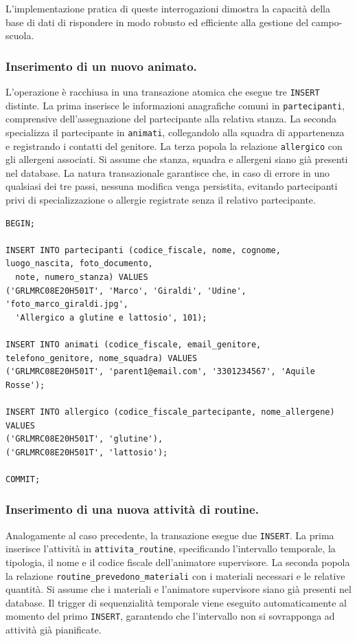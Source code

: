 \documentclass[11pt,a4paper]{article}
\begin{document}
L'implementazione pratica di queste interrogazioni dimostra la capacità della base di dati di
rispondere in modo robusto ed efficiente alla gestione del campo-scuola.

\subsubsection{Inserimento di un nuovo animato.}
L'operazione è racchiusa in una transazione atomica che esegue tre \texttt{INSERT} distinte. La
prima inserisce le informazioni anagrafiche comuni in \texttt{partecipanti}, comprensive
dell'assegnazione del partecipante alla relativa stanza. La seconda specializza il partecipante
in \texttt{animati}, collegandolo alla squadra di appartenenza e registrando i contatti del
genitore. La terza popola la relazione \texttt{allergico} con gli allergeni associati. Si
assume che stanza, squadra e allergeni siano già presenti nel database. La natura transazionale
garantisce che, in caso di errore in uno qualsiasi dei tre passi, nessuna modifica venga
persistita, evitando partecipanti privi di specializzazione o allergie registrate senza il
relativo partecipante.

\begin{verbatim}
BEGIN;

INSERT INTO partecipanti (codice_fiscale, nome, cognome, luogo_nascita, foto_documento,
  note, numero_stanza) VALUES
('GRLMRC08E20H501T', 'Marco', 'Giraldi', 'Udine', 'foto_marco_giraldi.jpg',
  'Allergico a glutine e lattosio', 101);

INSERT INTO animati (codice_fiscale, email_genitore, telefono_genitore, nome_squadra) VALUES
('GRLMRC08E20H501T', 'parent1@email.com', '3301234567', 'Aquile Rosse');

INSERT INTO allergico (codice_fiscale_partecipante, nome_allergene) VALUES
('GRLMRC08E20H501T', 'glutine'),
('GRLMRC08E20H501T', 'lattosio');

COMMIT;
\end{verbatim}

\subsubsection{Inserimento di una nuova attività di routine.}
Analogamente al caso precedente, la transazione esegue due \texttt{INSERT}. La prima inserisce
l'attività in \texttt{attivita\_routine}, specificando l'intervallo temporale, la tipologia, il
nome e il codice fiscale dell'animatore supervisore. La seconda popola la relazione
\texttt{routine\_prevedono\_materiali} con i materiali necessari e le relative quantità. Si
assume che i materiali e l'animatore supervisore siano già presenti nel database. Il trigger di
sequenzialità temporale viene eseguito automaticamente al momento del primo \texttt{INSERT},
garantendo che l'intervallo non si sovrapponga ad attività già pianificate.
\end{document}
